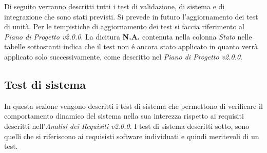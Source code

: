 Di seguito verranno descritti tutti i test di validazione, di sistema e di integrazione che sono stati previsti. Si prevede in futuro l'aggiornamento dei test di unità. Per le tempistiche di aggiornamento dei test si faccia riferimento al \textit{Piano di Progetto v2.0.0}. La dicitura \textbf{N.A.} contenuta nella colonna \textit{Stato} nelle tabelle sottostanti indica che il test non é ancora stato applicato in quanto verrà applicato solo successivamente, come descritto nel \textit{Piano di Progetto v2.0.0}.


\subsection{Test di sistema}
In questa sezione vengono descritti i test di sistema che permettono di verificare il comportamento dinamico del sistema nella sua interezza rispetto ai requisiti descritti nell'\textit{Analisi dei Requisiti v2.0.0}.
I test di sistema descritti sotto, sono quelli che si riferiscono ai requisisti software individuati e quindi meritevoli di un test.

